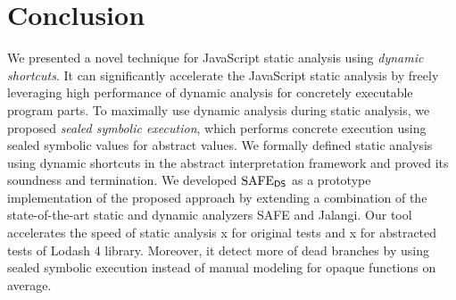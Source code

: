 \section{Conclusion}\label{sec:conclusion}
We presented a novel technique for JavaScript static analysis using \textit{dynamic shortcuts}.
It can significantly accelerate the JavaScript static
analysis by freely leveraging high performance of dynamic analysis for
concretely executable program parts.  To maximally use dynamic analysis during static analysis,
we proposed \textit{sealed symbolic execution}, which performs
concrete execution using sealed symbolic values for abstract values.
We formally defined static analysis using dynamic shortcuts in the
abstract interpretation framework and proved its soundness and termination.
We developed $\text{SAFE}_{\textsf{DS}}$ as a prototype implementation of the proposed approach
by extending a combination of the state-of-the-art static and dynamic
analyzers SAFE and Jalangi.  Our tool accelerates the speed
of static analysis x for original tests and x for
abstracted tests of Lodash 4 library.  Moreover, it detect  more of
dead branches by using sealed symbolic execution instead of
manual modeling for  opaque functions on average.
